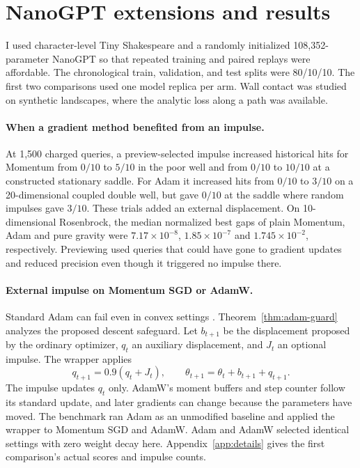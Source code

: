 \documentclass[10pt,letterpaper]{article}
\begin{document}
\clearpage
\section{NanoGPT extensions and results}
\label{sec:neural}

I used character-level Tiny Shakespeare \cite{data} and a randomly initialized 108,352-parameter NanoGPT \cite{nanogpt} so that repeated training and paired replays were affordable. The chronological train, validation, and test splits were 80/10/10. The first two comparisons used one model replica per arm. Wall contact was studied on synthetic landscapes, where the analytic loss along a path was available.

\paragraph{When a gradient method benefited from an impulse.}
At 1,500 charged queries, a preview-selected impulse increased historical hits for Momentum from \(0/10\) to \(5/10\) in the poor well and from \(0/10\) to \(10/10\) at a constructed stationary saddle. For Adam it increased hits from \(0/10\) to \(3/10\) on a 20-dimensional coupled double well, but gave \(0/10\) at the saddle where random impulses gave \(3/10\). These trials added an external displacement. On 10-dimensional Rosenbrock, the median normalized best gaps of plain Momentum, Adam and pure gravity were \(7.17\times10^{-8}\), \(1.85\times10^{-7}\) and \(1.745\times10^{-2}\), respectively. Previewing used queries that could have gone to gradient updates and reduced precision even though it triggered no impulse there.

\paragraph{External impulse on Momentum SGD or AdamW.}
Standard Adam can fail even in convex settings \cite{adamcounter}. Theorem~\ref{thm:adam-guard} analyzes the proposed descent safeguard.
Let \(b_{t+1}\) be the displacement proposed by the ordinary optimizer, \(q_t\) an auxiliary displacement, and \(J_t\) an optional impulse. The wrapper applies
\[
q_{t+1}=0.9(q_t+J_t),\qquad
\theta_{t+1}=\theta_t+b_{t+1}+q_{t+1}.
\]
The impulse updates \(q_t\) only. AdamW's moment buffers and step counter follow its standard update, and later gradients can change because the parameters have moved. The benchmark ran Adam as an unmodified baseline and applied the wrapper to Momentum SGD and AdamW. Adam and AdamW selected identical settings with zero weight decay here. Appendix~\ref{app:details} gives the first comparison's actual scores and impulse counts.
\end{document}
